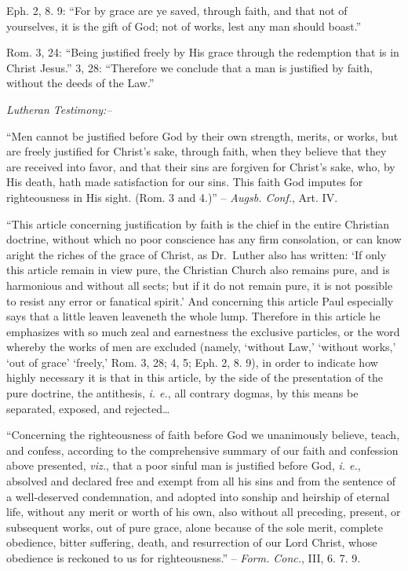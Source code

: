 \documentclass[
]{book}
\begin{document}
Eph. 2, 8. 9: ``For by grace are ye saved, through faith, and that not of yourselves, it is the gift of God; not of works, lest any man should boast.''

Rom. 3, 24: ``Being justified freely by His grace through the redemption that is in Christ Jesus.'' 3, 28: ``Therefore we conclude that a man is justified by faith, without the deeds of the Law.''

\begin{center}
\textsl{Lutheran Testimony:--}
\end{center}

``Men cannot be justified before God by their own strength, merits, or works, but are freely justified for Christ's sake, through faith, when they believe that they are received into favor, and that their sins are forgiven for Christ's sake, who, by His death, hath made satisfaction for our sins. This faith God imputes for righteousness in His sight. (Rom. 3 and 4.)'' -- \emph{Augsb. Conf.}, Art. IV.

``This article concerning justification by faith is the chief in the entire Christian doctrine, without which no poor conscience has any firm consolation, or can know aright the riches of the grace of Christ, as Dr.~Luther also has written: `If only this article remain in view pure, the Christian Church also remains pure, and is harmonious and without all sects; but if it do not remain pure, it is not possible to resist any error or fanatical spirit.' And concerning this article Paul especially says that a little leaven leaveneth the whole lump. Therefore in this article he emphasizes with so much zeal and earnestness the exclusive particles, or the word whereby the works of men are excluded (namely, `without Law,' `without works,' `out of grace' `freely,' Rom. 3, 28; 4, 5; Eph. 2, 8. 9), in order to indicate how highly necessary it is that in this article, by the side of the presentation of the pure doctrine, the antithesis, \emph{i. e.}, all contrary dogmas, by this means be separated, exposed, and rejected\ldots{}

``Concerning the righteousness of faith before God we unanimously believe, teach, and confess, according to the comprehensive summary of our faith and confession above presented, \emph{viz.}, that a poor sinful man is justified before God, \emph{i. e.}, absolved and declared free and exempt from all his sins and from the sentence of a well-deserved condemnation, and adopted into sonship and heirship of eternal life, without any merit or worth of his own, also without all preceding, present, or subsequent works, out of pure grace, alone because of the sole merit, complete obedience, bitter suffering, death, and resurrection of our Lord Christ, whose obedience is reckoned to us for righteousness.'' -- \emph{Form. Conc.}, III, 6. 7. 9.
\end{document}
